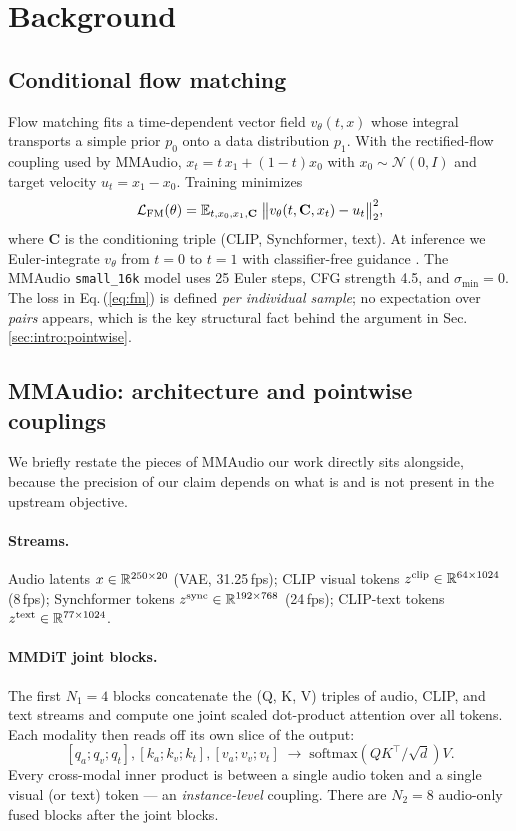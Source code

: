\section{Background}
\label{sec:background}

\subsection{Conditional flow matching}
Flow matching \citep{lipman2022flow} fits a time-dependent vector
field $v_\theta(t, x)$ whose integral transports a simple prior
$p_0$ onto a data distribution $p_1$. With the rectified-flow
coupling used by MMAudio, $x_t = t\, x_1 + (1 - t) x_0$ with
$x_0 \sim \mathcal{N}(0,I)$ and target velocity $u_t = x_1 - x_0$.
Training minimizes
\begin{equation}
\label{eq:fm}
  \mathcal{L}_{\mathrm{FM}}(\theta) = \mathbb{E}_{t, x_0, x_1, \mathbf{C}}\;
    \bigl\lVert v_\theta(t, \mathbf{C}, x_t) - u_t \bigr\rVert_2^2,
\end{equation}
where $\mathbf{C}$ is the conditioning triple (CLIP, Synchformer,
text). At inference we Euler-integrate $v_\theta$ from $t{=}0$ to
$t{=}1$ with classifier-free guidance \citep{tong2023improving}.
The MMAudio \texttt{small\_16k} model uses 25 Euler steps, CFG
strength 4.5, and $\sigma_{\min} = 0$. The loss in
Eq.\,(\ref{eq:fm}) is defined \emph{per individual sample}; no
expectation over \emph{pairs} appears, which is the key
structural fact behind the argument in
Sec.\,\ref{sec:intro:pointwise}.

\subsection{MMAudio: architecture and pointwise couplings}
\label{sec:background:mmaudio}
We briefly restate the pieces of MMAudio our work directly sits
alongside, because the precision of our claim depends on what is
and is not present in the upstream objective.

\paragraph{Streams.} Audio latents $x \in \mathbb{R}^{250 \times 20}$
(VAE, 31.25\,fps); CLIP visual tokens $z^{\text{clip}} \in
\mathbb{R}^{64 \times 1024}$ (8\,fps); Synchformer tokens $z^{\text{sync}}
\in \mathbb{R}^{192 \times 768}$ (24\,fps); CLIP-text tokens
$z^{\text{text}} \in \mathbb{R}^{77 \times 1024}$.

\paragraph{MMDiT joint blocks.}
The first $N_1{=}4$ blocks concatenate the (Q, K, V) triples of
audio, CLIP, and text streams and compute one joint scaled
dot-product attention over all tokens. Each modality then reads
off its own slice of the output:
\[
  [q_a; q_v; q_t],
  [k_a; k_v; k_t],
  [v_a; v_v; v_t]
  \;\longrightarrow\;
  \mathrm{softmax}(QK^\top/\sqrt{d}) V.
\]
Every cross-modal inner product is between a single audio token
and a single visual (or text) token --- an \emph{instance-level}
coupling. There are $N_2{=}8$ audio-only fused blocks after the
joint blocks.


